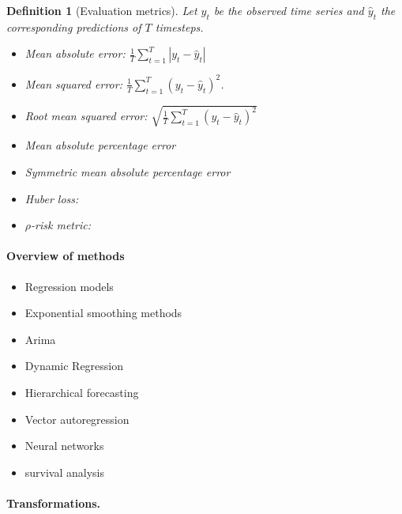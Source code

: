 \documentclass[12pt,a4paper]{article}
\newtheorem{definition}{Definition}
\begin{document}
\begin{definition}[Evaluation metrics]
	Let $y_t$ be the observed time series and  $\hat y_t$ the corresponding predictions of $T$ timesteps.
	\begin{itemize}
		\item Mean absolute error:  $\frac{1}{T}\sum_{t=1}^T \left | y_t - \hat y_t\right |$
		  \item Mean squared error: $\frac{1}{T}\sum_{t=1}^T \left ( y_t - \hat y_t\right ) ^2$. 
		  \item Root mean squared error:  $\sqrt{\frac{1}{T}\sum_{t=1}^T \left ( y_t - \hat y_t\right ) ^2}$
		  \item Mean absolute percentage error
		  \item Symmetric mean absolute percentage error
		  \item Huber loss: 
		  \item $\rho$-risk metric:
		  
	\end{itemize}
\end{definition}


\paragraph{Overview of methods} 
\begin{itemize}
	\item Regression models
	\item Exponential smoothing methods
	\item Arima
	\item Dynamic Regression 
	\item Hierarchical forecasting
	\item Vector autoregression
	\item Neural networks
	\item survival analysis
\end{itemize}

\paragraph{Transformations.}



\end{document}
